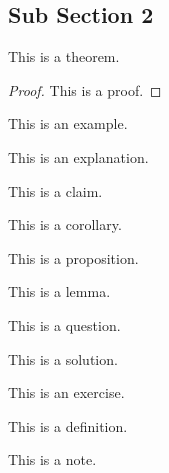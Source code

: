 

\subsection{Sub Section 2}
\label{sub_sec:sub_section_2}

\begin{theorem}
This is a theorem.
\end{theorem}
\begin{proof}
This is a proof.
\end{proof}
\begin{example}
This is an example.
\end{example}
\begin{explanation}
This is an explanation.
\end{explanation}
\begin{claim}
This is a claim.
\end{claim}
\begin{corollary}
This is a corollary.
\end{corollary}
\begin{prop}
This is a proposition.
\end{prop}
\begin{lemma}
This is a lemma.
\end{lemma}
\begin{question}
This is a question.
\end{question}
\begin{solution}
This is a solution.
\end{solution}
\begin{exercise}
This is an exercise.
\end{exercise}
\begin{definition}[Definition]
This is a definition.
\end{definition}
\begin{note}
This is a note.
\end{note}


\newpage